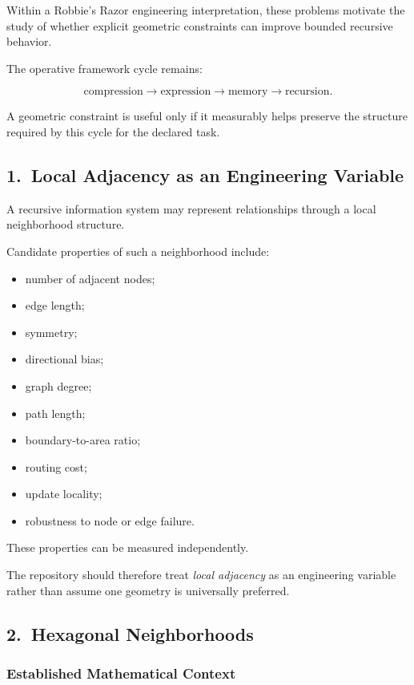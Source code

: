 Within a Robbie's Razor engineering interpretation, these problems motivate
the study of whether explicit geometric constraints can improve bounded
recursive behavior.

The operative framework cycle remains:

\[
\text{compression}
\rightarrow
\text{expression}
\rightarrow
\text{memory}
\rightarrow
\text{recursion}.
\]

A geometric constraint is useful only if it measurably helps preserve the
structure required by this cycle for the declared task.

\subsection*{1.\ Local Adjacency as an Engineering Variable}

A recursive information system may represent relationships through a local
neighborhood structure.

Candidate properties of such a neighborhood include:

\begin{itemize}
    \item number of adjacent nodes;
    \item edge length;
    \item symmetry;
    \item directional bias;
    \item graph degree;
    \item path length;
    \item boundary-to-area ratio;
    \item routing cost;
    \item update locality;
    \item robustness to node or edge failure.
\end{itemize}

These properties can be measured independently.

The repository should therefore treat \emph{local adjacency} as an engineering
variable rather than assume one geometry is universally preferred.

\subsection*{2.\ Hexagonal Neighborhoods}

\subsubsection*{Established Mathematical Context}

